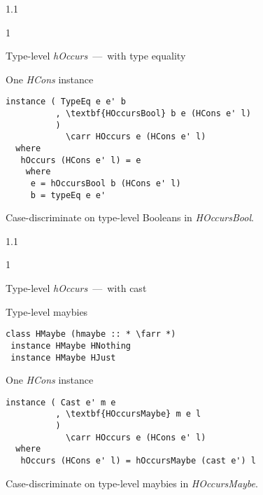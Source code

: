 \documentclass{slides}
\newenvironment{myslide}{\begin{slide}\color{Blue}\begin{boxedminipage}{1.1\hsize}\begin{boxedminipage}{1\hsize}\color{Black}
\vspace{-170\in}
}{%
\smallskip
\end{boxedminipage}
\end{boxedminipage}
\end{slide}}
\newenvironment{myslide}{\begin{slide}
}{%
\end{slide}}
\newenvironment{myslide}{\begin{slide}\color{White}\begin{boxedminipage}{1.1\hsize}\color{Black}
\vspace{-170\in}
}{%
\smallskip
\end{boxedminipage}
\end{slide}}
\newcommand{\header}[1]{{\large \color{Red} #1}}
\newcommand{\blau}[1]{{\vspace{-50\in}\normalsize \color{Blue} #1}}
\newcommand{\farr}{\ensuremath{\to}}
\newcommand{\carr}{\ensuremath{\Rightarrow}}
\begin{document}



\begin{myslide}

\header{Type-level \emph{hOccurs}~---~with type equality}

\vspace{-77\in}

\blau{One \emph{HCons} instance}

\bigskip

\begin{Verbatim}[fontfamily=courier,fontsize=\small,commandchars=\\\{\}]
 instance ( TypeEq e e' b
          , \textbf{HOccursBool} b e (HCons e' l) 
          )
            \carr HOccurs e (HCons e' l)
  where
   hOccurs (HCons e' l) = e
    where
     e = hOccursBool b (HCons e' l)
     b = typeEq e e'
\end{Verbatim}

{\small

Case-discriminate on type-level Booleans in \emph{HOccursBool}.

}

\end{myslide}






\begin{myslide}

\header{Type-level \emph{hOccurs}~---~with cast}

\vspace{-77\in}

\blau{Type-level maybies}

\begin{Verbatim}[fontfamily=courier,fontsize=\small,commandchars=\\\{\}]
 class HMaybe (hmaybe :: * \farr *)
 instance HMaybe HNothing
 instance HMaybe HJust
\end{Verbatim}

\vspace{-77\in}

\blau{One \emph{HCons} instance}

\bigskip

\begin{Verbatim}[fontfamily=courier,fontsize=\small,commandchars=\\\{\}]
 instance ( Cast e' m e
          , \textbf{HOccursMaybe} m e l 
          )
            \carr HOccurs e (HCons e' l)
  where
   hOccurs (HCons e' l) = hOccursMaybe (cast e') l
\end{Verbatim}

{\small

Case-discriminate on type-level maybies in \emph{HOccursMaybe}.

}

\end{myslide}
\end{document}
